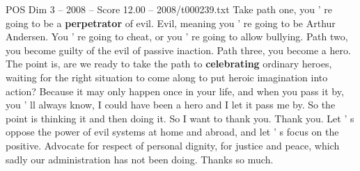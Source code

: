 \begin{textsample}{POS Dim 3 – 2008 – Score 12.00 – 2008/t000239.txt}
Take path one, you ' re going to be a \textbf{perpetrator} of evil.
Evil, meaning you ' re going to be Arthur Andersen.
You ' re going to cheat, or you ' re going to allow bullying.
Path two, you become guilty of the evil of passive inaction.
Path three, you become a hero.
The point is, are we ready to take the path to \textbf{celebrating} ordinary heroes, waiting for the right situation to come along to put heroic imagination into action?
Because it may only happen once in your life, and when you pass it by, you ' ll always know, I could have been a hero and I let it pass me by.
So the point is thinking it and then doing it.
So I want to thank you.
Thank you.
Let ' s oppose the power of evil systems at home and abroad, and let ' s focus on the positive.
Advocate for respect of personal dignity, for justice and peace, which sadly our administration has not been doing.
Thanks so much.

\end{textsample}
